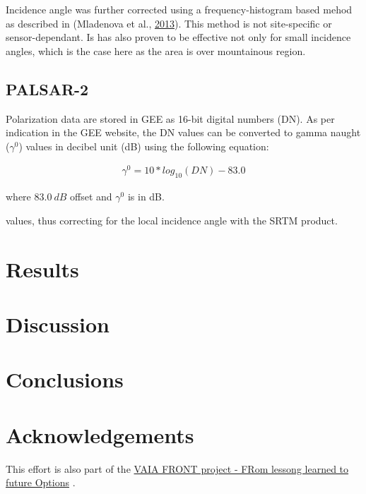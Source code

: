 \documentclass[]{elsarticle} %
\begin{document}
Incidence angle was further corrected using a frequency-histogram based
mehod as described in (Mladenova et al.,
\protect\hyperlink{ref-Mladenova2013}{2013}). This method is not
site-specific or sensor-dependant. Is has also proven to be effective
not only for small incidence angles, which is the case here as the area
is over mountainous region.

\hypertarget{palsar-2}{%
\subsection{PALSAR-2}\label{palsar-2}}

Polarization data are stored in GEE as 16-bit digital numbers (DN). As
per indication in the GEE website, the DN values can be converted to
gamma naught (\(\gamma^0\)) values in decibel unit (dB) using the
following equation:

\[
\begin{aligned}
 \gamma^0 = 10*log_{10}(DN) - 83.0  
\end{aligned}
\]

where \(83.0 \  dB\) offset and \(\gamma^0\) is in dB.

values, thus correcting for the local incidence angle with the SRTM
product.

\hypertarget{results}{%
\section{Results}\label{results}}

\hypertarget{discussion}{%
\section{Discussion}\label{discussion}}

\hypertarget{conclusions}{%
\section{Conclusions}\label{conclusions}}

\hypertarget{acknowledgements}{%
\section{Acknowledgements}\label{acknowledgements}}

This effort is also part of the
\href{https://www.tesaf.unipd.it/ricerca/progetti-dip-tesaf}{VAIA FRONT
project - FRom lessong learned to future Options} .
\end{document}
